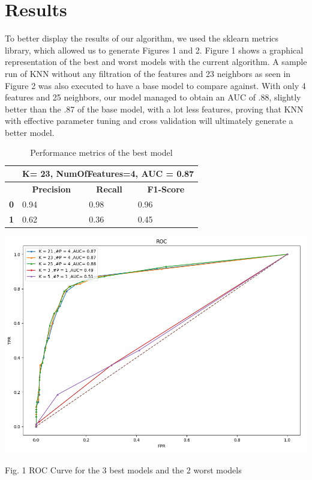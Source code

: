 \documentclass{article}
\begin{document}
 \section{Results}
To better display the results of our algorithm, we used the sklearn metrics library, which allowed us to generate Figures 1 and 2. Figure 1 shows a graphical representation of the best and worst models with the current algorithm. A sample run of KNN without any filtration of the features and 23 neighbors as seen in Figure 2 was also executed to have a base model to compare against. With only 4 features and 25 neighbors, our model managed to obtain an AUC of .88, slightly better than the .87 of the base model, with a lot less features, proving that KNN with effective parameter tuning and cross validation will ultimately generate a better model. 

 \begin{table}[H]
\begin{tabular}{|l|l|l|l|}
\hline
           & \multicolumn{3}{l|}{\textbf{K= 23, NumOfFeatures=4, AUC = 0.87}}                                                    
            \\ \hline  
          
            
           & \multicolumn{1}{c|}{\textbf{Precision}} & \multicolumn{1}{c|}{\textbf{Recall}} & \multicolumn{1}{c|}{\textbf{F1-Score}} \\ \hline
\textbf{0} & 0.94 & 0.98                                 & 0.96                                   \\ \hline
\textbf{1} & 0.62 & 0.36                                 & 0.45 \\ \hline
\end{tabular}
\caption{Performance metrics of the best model}
\end{table}

\begin{center}
\includegraphics[scale=.2]{ROCNew.png} %
\end{center}
Fig. 1 ROC Curve for the 3 best models and the 2 worst models\\
\end{document}
